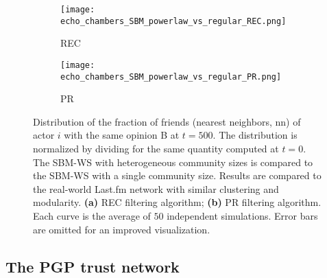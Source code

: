 \documentclass[11 pt , letterpaper , twoside , openright]{book}
\begin{document}
\begin{figure}[H]
  \begin{subfigure}[b]{0.49\textwidth}
    \caption{REC}
  	\texttt{[image: echo\_chambers\_SBM\_powerlaw\_vs\_regular\_REC.png]}
    \label{pr_pow_single}
  \end{subfigure}
  \begin{subfigure}[b]{0.49\textwidth}
    \caption{PR}
  	\texttt{[image: echo\_chambers\_SBM\_powerlaw\_vs\_regular\_PR.png]}
    \label{rec_pow_single}
  \end{subfigure}
  \captionsetup{format=plain}
  \caption[Distribution of the fraction of friends (nearest neighbors, nn) of actor $i$ with the same opinion B at $t = 500$. The SBM-WS with heterogeneous community sizes is compared to the SBM-WS with a single community size. Results are compared to the real-world Last.fm network with similar clustering and modularity. Results for the REC and PR filtering algorithms.]{Distribution of the fraction of friends (nearest neighbors, nn) of actor $i$ with the same opinion B at $t = 500$. The distribution is normalized by dividing for the same quantity computed at $t=0$. The SBM-WS with heterogeneous community sizes is compared to the SBM-WS with a single community size. Results are compared to the real-world Last.fm network with similar clustering and modularity. \textbf{(a)} REC filtering algorithm; \textbf{(b)} PR filtering algorithm. Each curve is the average of $50$ independent simulations. Error bars are omitted for an improved visualization.}
\label{power_vs_single}
\end{figure}

\subsection{The PGP trust network}
\end{document}
